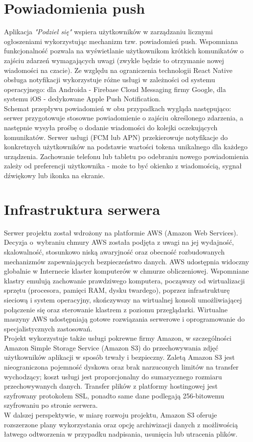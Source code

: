 \documentclass[12pt]{article}
\begin{document}
\section*{Powiadomienia push}
Aplikacja \textit{"Podziel się"} wspiera użytkowników w zarządzaniu licznymi ogłoszeniami wykorzystując mechanizm tzw. powiadomień push. Wspomniana funkcjonalność pozwala na wyświetlanie użytkownikom krótkich komunikatów o zajściu zdarzeń wymagających uwagi (zwykle będzie to otrzymanie nowej wiadomości na czacie). Ze względu na ograniczenia technologii React Native obsługa notyfikacji wykorzystuje różne usługi w zależności od systemu operacyjnego: dla Androida - Firebase Cloud Messaging firmy Google, dla systemu iOS - dedykowane Apple Push Notification.
\vspace{4mm}\\Schemat przepływu powiadomień w obu przypadkach wygląda następująco: serwer przygotowuje stosowne powiadomienie o zajściu określonego zdarzenia, a następnie wysyła prośbę o dodanie wiadomości do kolejki oczekujących komunikatów. Serwer usługi (FCM lub APN) przekierowuje notyfikacje do konkretnych użytkowników na podstawie wartości tokena unikalnego dla każdego urządzenia. Zachowanie telefonu lub tabletu po odebraniu nowego powiadomienia zależy od preferencji użytkownika - może to być okienko z wiadomością, sygnał dźwiękowy lub ikonka na ekranie.

\section*{Infrastruktura serwera}
Serwer projektu został wdrożony na platformie AWS (Amazon Web Services). Decyzja o~wybraniu chmury AWS została podjęta z uwagi na jej wydajność, skalowalność, stosunkowo niską awaryjność oraz obecność rozbudowanych mechanizmów zapewniających bezpieczeństwo danych. AWS udostępnia widoczny globalnie w Internecie klaster komputerów w chmurze obliczeniowej. Wspomniane klastry emulują zachowanie prawdziwego komputera, począwszy od wirtualizacji sprzętu (procesora, pamięci RAM, dysku twardego), poprzez infrastrukturę sieciową i system operacyjny, skończywszy na wirtualnej konsoli umożliwiającej połączenie się oraz sterowanie klastrem z poziomu przeglądarki. Wirtualne maszyny AWS udostępniają gotowe rozwiązania serwerowe i oprogramowanie do specjalistycznych zastosowań.
\vspace{4mm}\\Projekt wykorzystuje także usługi pokrewne firmy Amazon, w szczególności Amazon Simple Storage Service (Amazon S3) do przechowywania zdjęć użytkowników aplikacji w sposób trwały i bezpieczny. Zaletą Amazon S3 jest nieograniczona pojemność dyskowa oraz brak narzuconych limitów na transfer wychodzący; koszt usługi jest proporcjonalny do sumarycznego rozmiaru przechowywanych danych. Transfer plików z platformy hostingowej jest szyfrowany protokołem SSL, ponadto same dane podlegają 256-bitowemu szyfrowaniu po stronie serwera.
\vspace{4mm}\\W dalszej perspektywie, w miarę rozwoju projektu, Amazon S3 oferuje rozszerzone plany wykorzystania oraz opcję archiwizacji danych z możliwością łatwego odtworzenia w przypadku nadpisania, usunięcia lub utracenia plików.
\end{document}
